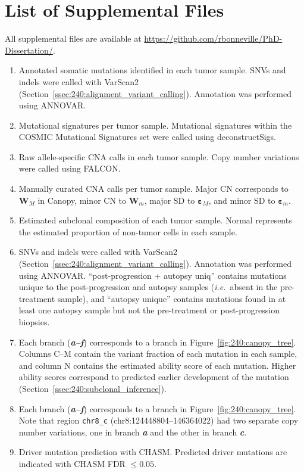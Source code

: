 \section{List of Supplemental Files}
All supplemental files are available at \url{https://github.com/rbonneville/PhD-Dissertation/}.
\begin{enumerate}
    \renewcommand*{\labelenumi}{S\thechapter{}.\arabic{enumi}. }
    \item Annotated somatic mutations identified in each tumor sample. SNVs and indels were called with VarScan2 (Section~\ref{ssec:240:alignment_variant_calling}). Annotation was performed using ANNOVAR.
    \item Mutational signatures per tumor sample. Mutational signatures within the COSMIC Mutational Signatures set were called using deconstructSigs.
    \item Raw allele-specific CNA calls in each tumor sample. Copy number variations were called using FALCON.
    \item Manually curated CNA calls per tumor sample. Major CN corresponds to $\mathbf{W}_M$ in Canopy, minor CN to $\mathbf{W}_m$, major SD to $\mathbf{\varepsilon}_M$, and minor SD to $\mathbf{\varepsilon}_m$.
    \item Estimated subclonal composition of each tumor sample. Normal represents the estimated proportion of non-tumor cells in each sample.
    \item SNVs and indels were called with VarScan2 (Section~\ref{ssec:240:alignment_variant_calling}). Annotation was performed using ANNOVAR. ``post-progression + autopsy uniq'' contains mutations unique to the post-progression and autopsy samples (\textit{i.e.}\ absent in the pre-treatment sample), and ``autopsy unique'' contains mutations found in at least one autopsy sample but not the pre-treatment or post-progression biopsies.
    \item Each branch (\textbf{\textit{a--f}}) corresponds to a branch in Figure~\ref{fig:240:canopy_tree}. Columns C--M contain the variant fraction of each mutation in each sample, and column N contains the estimated ability score of each mutation. Higher ability scores correspond to predicted earlier development of the mutation (Section~\ref{ssec:240:subclonal_inference}).
    \item Each branch (\textbf{\textit{a--f}}) corresponds to a branch in Figure~\ref{fig:240:canopy_tree}. Note that region \texttt{chr8\_c} (chr8:124448804--146364022) had two separate copy number variations, one in branch \textbf{\textit{a}} and the other in branch \textbf{\textit{c}}.
    \item Driver mutation prediction with CHASM\@. Predicted driver mutations are indicated with CHASM FDR $\le 0.05$.
\end{enumerate}

